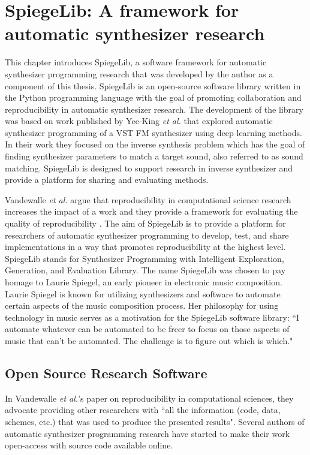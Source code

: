 \graphicspath{{./}{./figures/}{./figures/spiegelib/}}

\chapter{SpiegeLib: A framework for automatic synthesizer research}
\label{chapter:spiegelib}

This chapter introduces SpiegeLib, a software framework for automatic synthesizer programming  research that was developed by the author as a component of this thesis. SpiegeLib is an open-source software library written in the Python programming language with the goal of promoting collaboration and reproducibility in automatic synthesizer research. The development of the library was based on work published by Yee-King \textit{et al.} \cite{yee2018automatic} that explored automatic synthesizer programming of a VST FM synthesizer using deep learning methods. In their work they focused on the inverse synthesis problem which has the goal of finding synthesizer parameters to match a target sound, also referred to as sound matching. SpiegeLib is designed to support research in inverse synthesizer and provide a platform for sharing and evaluating methods.

Vandewalle \textit{et al.} argue that reproducibility in computational science research increases the impact of a work and they provide a framework for evaluating the quality of reproducibility \cite{vandewalle2009reproducible}. The aim of SpiegeLib is to provide a platform for researchers of automatic synthesizer programming to develop, test, and share implementations in a way that promotes reproducibility at the highest level. SpiegeLib stands for Synthesizer Programming with Intelligent Exploration, Generation, and Evaluation Library. The name SpiegeLib was chosen to pay homage to Laurie Spiegel, an early pioneer in electronic music composition. Laurie Spiegel is known for utilizing synthesizers and software to automate certain aspects of the music composition process. Her philosophy for using technology in music serves as a motivation for the SpiegeLib software library: ``I automate whatever can be automated to be freer to focus on those aspects of music that can't be automated. The challenge is to figure out which is which." \cite{hinkle2006women}

\section{Open Source Research Software}
 In Vandewalle \textit{et al.}'s paper on reproducibility in computational sciences, they advocate providing other researchers with ``all the information (code, data, schemes, etc.) that was used to produce the presented results"\cite{vandewalle2009reproducible}. Several authors of automatic synthesizer programming research have started to make their work open-access with source code available online. 
 
